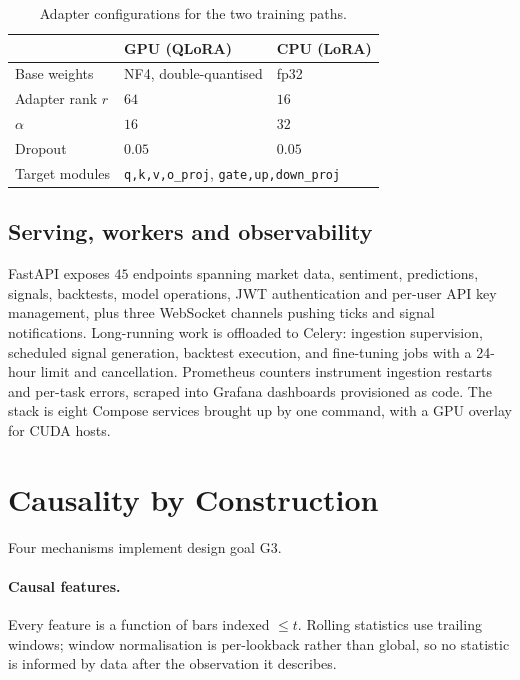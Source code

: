 \documentclass[preprint,12pt,authoryear]{elsarticle}
\begin{document}
\begin{table}[t]\centering\small
\caption{Adapter configurations for the two training paths.}
\label{tab:qlora}
\begin{tabular}{@{}lll@{}}
\toprule
& GPU (QLoRA) & CPU (LoRA) \\
\midrule
Base weights      & NF4, double-quantised & fp32 \\
Adapter rank $r$  & $64$ & $16$ \\
$\alpha$          & $16$ & $32$ \\
Dropout           & $0.05$ & $0.05$ \\
Target modules    & \multicolumn{2}{l}{\texttt{q,k,v,o\_proj}, \texttt{gate,up,down\_proj}} \\
\bottomrule
\end{tabular}
\end{table}

\subsection{Serving, workers and observability}

FastAPI exposes $45$ endpoints spanning market data, sentiment, predictions,
signals, backtests, model operations, JWT authentication and per-user API key
management, plus three WebSocket channels pushing ticks and signal
notifications. Long-running work is offloaded to Celery: ingestion supervision,
scheduled signal generation, backtest execution, and fine-tuning jobs with a
24-hour limit and cancellation. Prometheus counters instrument ingestion restarts
and per-task errors, scraped into Grafana dashboards provisioned as code. The
stack is eight Compose services brought up by one command, with a GPU overlay for
CUDA hosts.

\section{Causality by Construction}
\label{sec:causality}

Four mechanisms implement design goal G3.

\paragraph{Causal features.} Every feature is a function of bars indexed $\le t$.
Rolling statistics use trailing windows; window normalisation is per-lookback
rather than global, so no statistic is informed by data after the observation it
describes.
\end{document}
